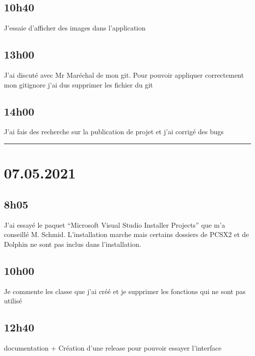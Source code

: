 \documentclass[a4paper,12pt,french]{sphinxmanual}
\begin{document}
\subsection{10h40}
\label{\detokenize{logbook:id80}}
\sphinxAtStartPar
J’essaie d’afficher des images dans l’application


\subsection{13h00}
\label{\detokenize{logbook:id81}}
\sphinxAtStartPar
J’ai discuté avec Mr Maréchal de mon git. Pour pouvoir appliquer correctement mon gitignore j’ai dus supprimer les fichier du git


\subsection{14h00}
\label{\detokenize{logbook:id82}}
\sphinxAtStartPar
J’ai fais des recherche sur la publication de projet et j’ai corrigé des bugs


\bigskip\hrule\bigskip



\section{07.05.2021}
\label{\detokenize{logbook:id83}}

\subsection{8h05}
\label{\detokenize{logbook:id84}}
\sphinxAtStartPar
J’ai essayé le paquet “Microsoft Visual Studio Installer Projects” que m’a conseillé M. Schmid. L’installation marche mais certains dossiers de PCSX2 et de Dolphin ne sont pas inclus dans l’installation.


\subsection{10h00}
\label{\detokenize{logbook:id85}}
\sphinxAtStartPar
Je commente les classe que j’ai créé et je supprimer les fonctions qui ne sont pas utilisé


\subsection{12h40}
\label{\detokenize{logbook:id86}}
\sphinxAtStartPar
documentation + Création d’une release pour pouvoir essayer l’interface
\end{document}
